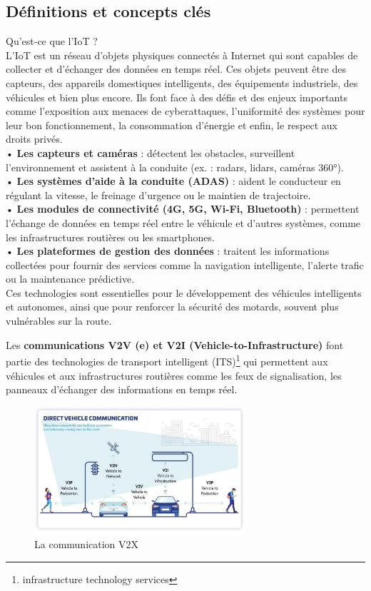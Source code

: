 \documentclass{article}
\begin{document}
\subsection{Définitions et concepts clés}
Qu'est-ce que l'IoT ?\\
L'IoT est un réseau d’objets physiques connectés à Internet qui sont capables de collecter et d’échanger des données en temps réel. Ces objets peuvent être des capteurs, des appareils domestiques intelligents, des équipements industriels, des véhicules et bien plus encore. Ils font face à des défis et des enjeux importants comme l'exposition aux menaces de cyberattaques, l'uniformité des systèmes pour leur bon fonctionnement, la consommation d'énergie et enfin, le respect aux droits privés. \\
• \textbf{Les capteurs et caméras} : détectent les obstacles, surveillent l’environnement et assistent à la conduite (ex. : radars, lidars, caméras 360°).\\
• \textbf{Les systèmes d’aide à la conduite (ADAS)} : aident le conducteur en régulant la vitesse, le freinage d’urgence ou le maintien de trajectoire.\\
• \textbf{Les modules de connectivité (4G, 5G, Wi-Fi, Bluetooth)} : permettent l’échange de données en temps réel entre le véhicule et d’autres systèmes, comme les infrastructures routières ou les smartphones.\\
• \textbf{Les plateformes de gestion des données} : traitent les informations collectées pour fournir des services comme la navigation intelligente, l’alerte trafic ou la maintenance prédictive.\\
Ces technologies sont essentielles pour le développement des véhicules intelligents et autonomes, ainsi que pour renforcer la sécurité des motards, souvent plus vulnérables sur la route.\\
\vspace{0.5cm}

Les \textbf{communications V2V (e) et V2I (Vehicle-to-Infrastructure)} font partie des technologies de transport intelligent (ITS)\footnote{infrastructure technology services} qui permettent aux véhicules et aux infrastructures routières comme les feux de signalisation, les panneaux d’échanger des informations en temps réel.

\begin{figure}[H]
    \centering
    \includegraphics[width=0.7\textwidth]{images/schema_v2.png} 
    \caption{La communication V2X}
\end{figure}
\end{document}
